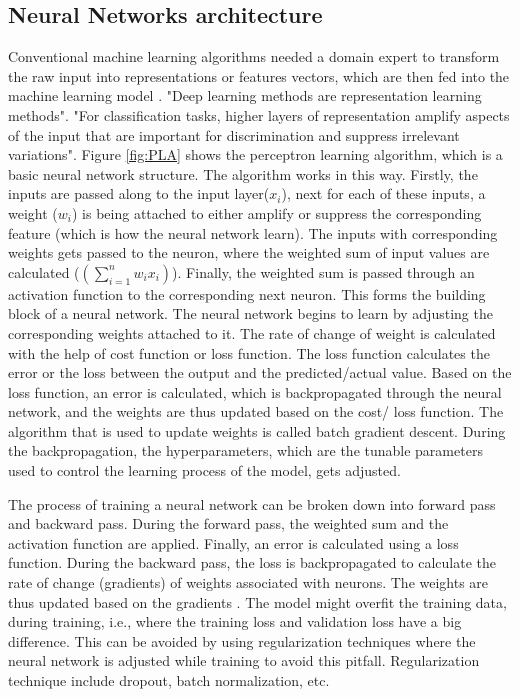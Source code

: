 \subsection{Neural Networks architecture}
Conventional machine learning algorithms needed a domain expert to transform the raw input into representations or features vectors, which are then fed into the machine learning model \cite{lecun2015deep}. "Deep learning methods are representation learning methods"\cite{lecun2015deep}. "For classification tasks, higher layers of representation
amplify aspects of the input that are important for discrimination and
suppress irrelevant variations"\cite{lecun2015deep}. Figure \ref{fig:PLA} shows the perceptron learning algorithm, which is a basic neural network structure. The algorithm works in this way. Firstly, the inputs are passed along to the input layer($x_i$), next for each of these inputs, a weight ($w_i$) is being attached to either amplify or suppress the corresponding feature (which is how the neural network learn). The inputs with corresponding weights gets passed to the neuron, where the weighted sum of input values are calculated ($(\sum_{i=1}^{n}w_ix_i)$). Finally, the weighted sum is passed through an activation function to the corresponding next neuron. This forms the building block of a neural network. The neural network begins to learn by adjusting the corresponding weights attached to it.\cite{lecun2015deep} The rate of change of weight is calculated with the help of cost function or loss function. The loss function calculates the error or the loss between the output and the predicted/actual value. Based on the loss function, an error is calculated, which is backpropagated through the neural network, and the weights are thus updated based on the cost/ loss function. The algorithm that is used to update weights is called batch gradient descent\cite{lecun2015deep}. During the backpropagation, the hyperparameters, which are the tunable parameters used to control the learning process of the model, gets adjusted\cite{rumelhart1995backpropagation}.

The process of training a neural network can be broken down into forward pass and backward pass. During the forward pass, the weighted sum and the activation function are applied. Finally, an error is calculated using a loss function. During the backward pass, the loss is backpropagated to calculate the rate of change (gradients)  of weights associated with neurons. The weights are thus updated based on the gradients \cite{rumelhart1995backpropagation}\cite{lecun2015deep}. The model might overfit the training data, during training, i.e., where the training loss and validation loss have a big difference. This can be avoided by using regularization techniques where the neural network is adjusted while training to avoid this pitfall\cite{girosi1995regularization}. Regularization technique include dropout, batch normalization, etc.







